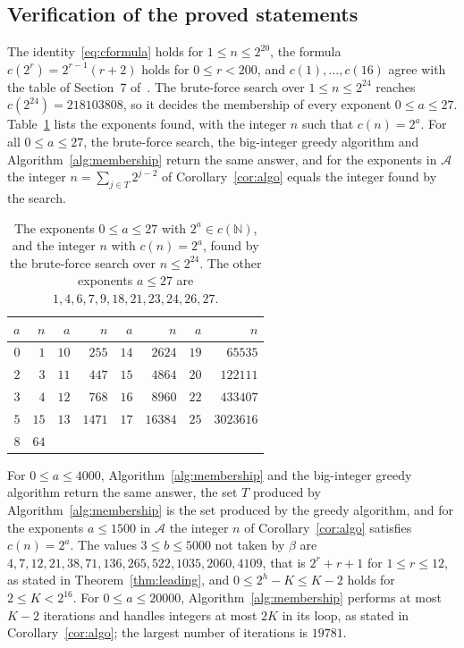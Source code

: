 \documentclass[11pt]{amsart}
\theoremstyle{definition}
\begin{document}
\subsection{Verification of the proved statements}
\label{subsec:verification}
The identity~\eqref{eq:cformula} holds for $1\le n\le2^{20}$, the formula $c(2^r)=2^{r-1}(r+2)$ holds for $0\le r<200$, and $c(1),\dots,c(16)$ agree with the table of Section~7 of~\cite{nicolas2005open}. The brute-force search over $1\le n\le2^{24}$ reaches $c(2^{24})=218103808$, so it decides the membership of every exponent $0\le a\le27$. Table~\ref{tab:brute} lists the exponents found, with the integer $n$ such that $c(n)=2^a$. For all $0\le a\le27$, the brute-force search, the big-integer greedy algorithm and Algorithm~\ref{alg:membership} return the same answer, and for the exponents in $\mathcal{A}$ the integer $n=\sum_{j\in T}2^{j-2}$ of Corollary~\ref{cor:algo} equals the integer found by the search.

\begin{table}[H]
\centering
\caption{The exponents $0\le a\le27$ with $2^a\in c(\mathbb{N})$, and the integer $n$ with $c(n)=2^a$, found by the brute-force search over $n\le2^{24}$. The other exponents $a\le27$ are $1,4,6,7,9,18,21,23,24,26,27$.}
\label{tab:brute}
\begin{tabular}{rrrrrrrr}
\toprule
$a$ & $n$ & $a$ & $n$ & $a$ & $n$ & $a$ & $n$\\
\midrule
$0$ & $1$ & $10$ & $255$ & $14$ & $2624$ & $19$ & $65535$\\
$2$ & $3$ & $11$ & $447$ & $15$ & $4864$ & $20$ & $122111$\\
$3$ & $4$ & $12$ & $768$ & $16$ & $8960$ & $22$ & $433407$\\
$5$ & $15$ & $13$ & $1471$ & $17$ & $16384$ & $25$ & $3023616$\\
$8$ & $64$ & & & & & &\\
\bottomrule
\end{tabular}
\end{table}

For $0\le a\le4000$, Algorithm~\ref{alg:membership} and the big-integer greedy algorithm return the same answer, the set $T$ produced by Algorithm~\ref{alg:membership} is the set produced by the greedy algorithm, and for the exponents $a\le1500$ in $\mathcal{A}$ the integer $n$ of Corollary~\ref{cor:algo} satisfies $c(n)=2^a$. The values $3\le b\le5000$ not taken by $\beta$ are $4,7,12,21,38,71,136,265,522,1035,2060,4109$, that is $2^r+r+1$ for $1\le r\le12$, as stated in Theorem~\ref{thm:leading}, and $0\le2^h-K\le K-2$ holds for $2\le K<2^{16}$. For $0\le a\le20000$, Algorithm~\ref{alg:membership} performs at most $K-2$ iterations and handles integers at most $2K$ in its loop, as stated in Corollary~\ref{cor:algo}; the largest number of iterations is $19781$.
\end{document}
